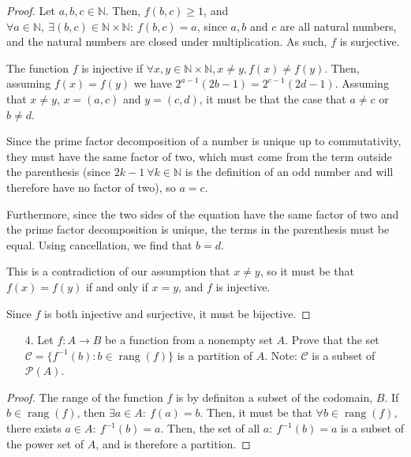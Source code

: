 \documentclass[10pt]{article}
\theoremstyle{definition}
\theoremstyle{plain}
\newcommand{\N}{\mathbb{N}}
\DeclareMathOperator\rang{rang}
\begin{document}
\begin{proof}
  Let $a,b,c\in\N$. Then, $f(b,c)\geq 1$, and $\forall a\in\N,\ \exists (b,c)\in\N\times\N:\ f(b,c)=a$, since $a,b$ and $c$ are all natural numbers, and the natural numbers are closed under multiplication. As such, $f$ is surjective.

  The function $f$ is injective if $\forall x,y\in\N\times\N, x\neq y, f(x)\neq f(y).$ Then, assuming $f(x)=f(y)$ we have $2^{a-1} (2b-1) = 2^{c-1} (2d-1).$ Assuming that $x\neq y$, $x=(a,c)$ and $y=(c,d)$, it must be that the case that $a\neq c$ or $b\neq d$.

  Since the prime factor decomposition of a number is unique up to commutativity, they must have the same factor of two, which must come from the term outside the parenthesis (since $2k-1 \ \forall k\in\N$ is the definition of an odd number and will therefore have no factor of two), so $a=c$.

  Furthermore, since the two sides of the equation have the same factor of two and the prime factor decomposition is unique, the terms in the parenthesis must be equal. Using cancellation, we find that $b=d$.

  This is a contradiction of our assumption that $x\neq y$, so it must be that $f(x)=f(y)$ if and only if $x=y$, and $f$ is injective.

  Since $f$ is both injective and surjective, it must be bijective.
\end{proof}



\pagebreak



\begin{enumerate}
\item[4.] Let $f:A \to B$ be a function from a nonempty set $A$.  Prove that the set $ \mathcal{C} = \{f^{-1}(b): b \in \rang(f)\}$ is a partition of $A$.  Note:  $\mathcal{C}$ is a subset of $\mathscr{P}(A)$.
\end{enumerate}



\begin{proof}
  The range of the function $f$ is by definiton a subset of the codomain, $B$. If $b\in\rang(f)$, then $\exists a\in A:\ f(a) = b$. Then, it must be that $\forall b\in\rang(f)$, there exists $a\in A:\ f^{-1}(b) = a$. Then, the set of all $a:\ f^{-1}(b) = a$ is a subset of the power set of $A$, and is therefore a partition.
\end{proof}
\end{document}
